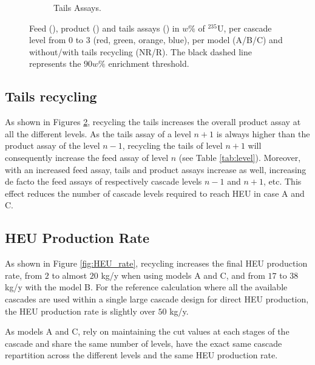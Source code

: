 \begin{figure}[h!]
\begin{subfigure}[t]{0.45\textwidth}
        \caption{Tails Assays.}
        \label{sfig:tails_assay}
    \end{subfigure}
    \caption{Feed (), product
        () and tails assays ()
        in $w\%$ of $^{235}$U, per cascade level from 0 to 3 (red, green, orange,
        blue), per model (A/B/C) and without/with tails recycling (NR/R). The
        black dashed line represents the $90 w\%$ enrichment threshold.}
    \label{fig:assays}
\end{figure}



\subsection{Tails recycling}

As shown in Figures \ref{fig:assays}, recycling the tails increases the overall product assay at
all the different levels. As the tails assay of a level $n+1$ is always higher than
the product assay of the level $n-1$, recycling the tails of level $n+1$ will
consequently increase the feed assay of level $n$ (see Table \ref{tab:level}).
Moreover, with an increased feed assay, tails and product assays increase as
well, increasing de facto the feed assays of respectively cascade levels $n-1$
and $n+1$, etc.  This effect reduces the number of cascade levels required to reach
\gls{HEU} in case A and C.



\subsection{\gls{HEU} Production Rate}

As shown in Figure \ref{fig:HEU_rate}, recycling increases the final \gls{HEU}
production rate, from $2$ to almost $20$ kg/y when using models A and C, and from
$17$ to $38$ kg/y with the model B. For the reference calculation where all the
available cascades are used within a single large cascade design for direct
\gls{HEU} production, the \gls{HEU} production rate is slightly over $50$ kg/y.


As models A and C, rely on maintaining the cut values at each stages of the
cascade and share the same number of levels, have the exact same cascade
repartition across the different levels and the same \gls{HEU} production rate.

